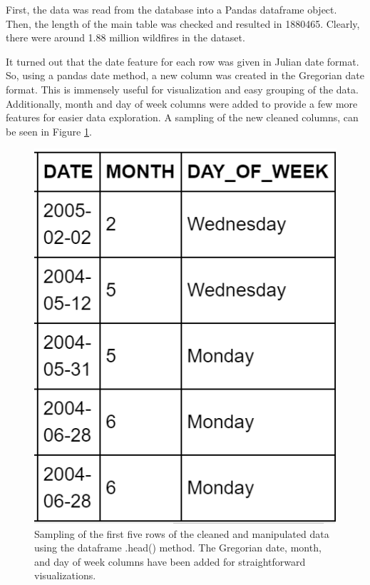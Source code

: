 \documentclass[conference]{IEEEtran}
\begin{document}
First, the data was read from the database into a Pandas dataframe object. Then, the length of the main table was checked and resulted in 1880465. Clearly, there were around 1.88 million wildfires in the dataset. \par

It turned out that the date feature for each row was given in Julian date format. So, using a pandas date method, a new column was created in the Gregorian date format. This is immensely useful for visualization and easy grouping of the data. Additionally, month and day of week columns were added to provide a few more features for easier data exploration. A sampling of the new cleaned columns, can be seen in Figure \ref{fig:cleaned_data}. \par

\begin{figure}
    \centering
    \includegraphics[scale=0.6]{img/cleaned_data.PNG}
    \caption{Sampling of the first five rows of the cleaned and manipulated data using the dataframe .head() method. The Gregorian date, month, and day of week columns have been added for straightforward visualizations.}
    \label{fig:cleaned_data}
\end{figure}
\end{document}
